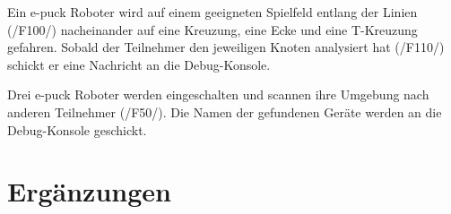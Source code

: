 \documentclass[10pt,a4paper]{article}
\begin{document}
				Ein e-puck Roboter wird auf einem geeigneten Spielfeld entlang der Linien (/F100/) nacheinander  auf eine 
				Kreuzung, 	eine Ecke und eine T-Kreuzung gefahren. Sobald der Teilnehmer den jeweiligen Knoten analysiert
				hat (/F110/) schickt er eine Nachricht an die Debug-Konsole.			
			
			
				Drei e-puck Roboter werden eingeschalten und scannen ihre
				Umgebung nach anderen Teilnehmer (/F50/). Die Namen der gefundenen
				Geräte werden an die Debug-Konsole geschickt.
				

	\section{Ergänzungen}
						
\end{document}
